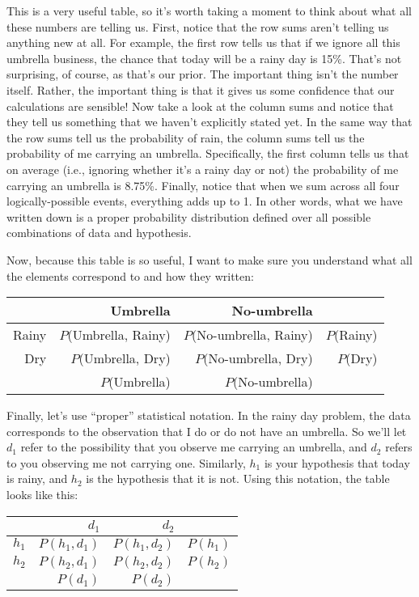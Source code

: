 This is a very useful table, so it's worth taking a moment to think about what all these numbers are telling us. First, notice that the row sums aren't telling us anything new at all. For example, the first row tells us that if we ignore all this umbrella business, the chance that today will be a rainy day is 15\%. That's not surprising, of course, as that's our prior. The important thing isn't the number itself. Rather, the important thing is that it gives us some confidence that our calculations are sensible! Now take a look at the column sums and notice that they tell us something that we haven't explicitly stated yet. In the same way that the row sums tell us the probability of rain, the column sums tell us the probability of me carrying an umbrella. Specifically, the first column tells us that on average (i.e., ignoring whether it's a rainy day or not) the probability of me carrying an umbrella is 8.75\%. Finally, notice that when we sum across all four logically-possible events, everything adds up to 1. In other words, what we have written down is a proper probability distribution defined over all possible combinations of data and hypothesis.

Now, because this table is so useful, I want to make sure you understand what all the elements correspond to and how they written:
\begin{center}
\begin{tabular}{r|rr|r}
& Umbrella & No-umbrella &  \\[6pt] \hline
Rainy & $P$(Umbrella, Rainy) & $P$(No-umbrella, Rainy) & $P$(Rainy) \\[6pt]
Dry & $P$(Umbrella, Dry) & $P$(No-umbrella, Dry)  & $P$(Dry) \\[6pt] \hline
 & $P$(Umbrella) & $P$(No-umbrella) & 
\end{tabular}
\end{center}
Finally, let's use ``proper'' statistical notation. In the rainy day problem, the data corresponds to the observation that I do or do not have an umbrella. So we'll let $d_1$ refer to the possibility that you observe me carrying an umbrella, and $d_2$ refers to you observing me not carrying one. Similarly, $h_1$ is your hypothesis that today is rainy, and $h_2$ is the hypothesis that it is not. Using this notation, the table looks like this:
\begin{center}
\begin{tabular}{r|rr|r}
& $d_1$ & $d_2$ &  \\[6pt] \hline
$h_1$ & $P(h_1, d_1)$ & $P(h_1, d_2)$ & $P(h_1)$ \\[6pt]
$h_2$ & $P(h_2, d_1)$ & $P(h_2, d_2)$ & $P(h_2)$ \\[6pt] \hline
 & $P(d_1)$ & $P(d_2)$ & 
\end{tabular}
\end{center}

